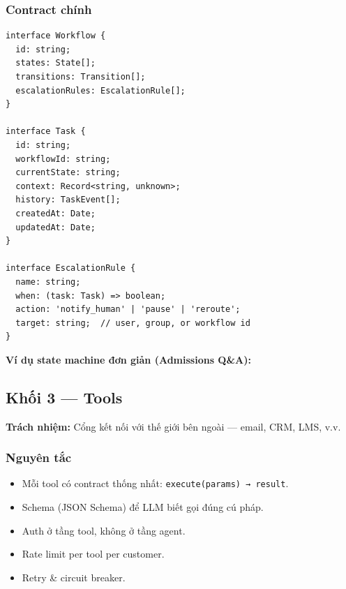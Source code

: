 \documentclass[11pt,a4paper]{article}
\begin{document}
\subsubsection*{Contract chính}

\begin{lstlisting}
interface Workflow {
  id: string;
  states: State[];
  transitions: Transition[];
  escalationRules: EscalationRule[];
}

interface Task {
  id: string;
  workflowId: string;
  currentState: string;
  context: Record<string, unknown>;
  history: TaskEvent[];
  createdAt: Date;
  updatedAt: Date;
}

interface EscalationRule {
  name: string;
  when: (task: Task) => boolean;
  action: 'notify_human' | 'pause' | 'reroute';
  target: string;  // user, group, or workflow id
}
\end{lstlisting}

\textbf{Ví dụ state machine đơn giản (Admissions Q\&A):}

\begin{center}
\end{center}

\subsection{Khối 3 — Tools}

\textbf{Trách nhiệm:} Cổng kết nối với thế giới bên ngoài --- email, CRM, LMS, v.v.

\subsubsection*{Nguyên tắc}
\begin{itemize}
\item Mỗi tool có contract thống nhất: \texttt{execute(params) → result}.
\item Schema (JSON Schema) để LLM biết gọi đúng cú pháp.
\item Auth ở tầng tool, không ở tầng agent.
\item Rate limit per tool per customer.
\item Retry \& circuit breaker.
\end{itemize}
\end{document}

